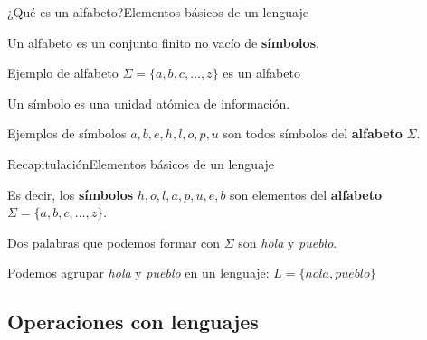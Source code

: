 \documentclass[spanish]{beamer}
\begin{document}
\begin{frame}{¿Qué es un alfabeto?}{Elementos básicos de un lenguaje}

    \begin{definition}
        Un \alert{alfabeto} es un conjunto finito no vacío de \textbf{símbolos}.
    \end{definition} \pause

    \bigskip

    \begin{exampleblock}{Ejemplo de alfabeto}
        $ \Sigma = \{ a, b, c, \dots , z \} $ es un alfabeto 
    \end{exampleblock} \pause

    \bigskip

    \begin{definition}
        Un \alert{símbolo} es una unidad atómica de información.
    \end{definition} \pause

    \bigskip

    \begin{exampleblock}{Ejemplos de símbolos}
        $a, b, e, h, l, o, p, u$ son todos símbolos del \textbf{alfabeto} $\Sigma$.
    \end{exampleblock}
    
\end{frame}

\begin{frame}{Recapitulación}{Elementos básicos de un lenguaje}

    Es decir, los \textbf{símbolos} $h, o, l, a, p, u, e, b$ son elementos del \textbf{alfabeto} $\Sigma = \{a, b, c, \dots , z\}$. \pause
    
    \bigskip

    Dos palabras que podemos formar con $\Sigma$ son \textit{hola} y \textit{pueblo}. \pause

    \bigskip

    Podemos agrupar \textit{hola} y \textit{pueblo} en un lenguaje: $L = \{hola, pueblo\}$
\end{frame}

\subsection{Operaciones con lenguajes}
\label{subsec:lang-ops}
\end{document}
